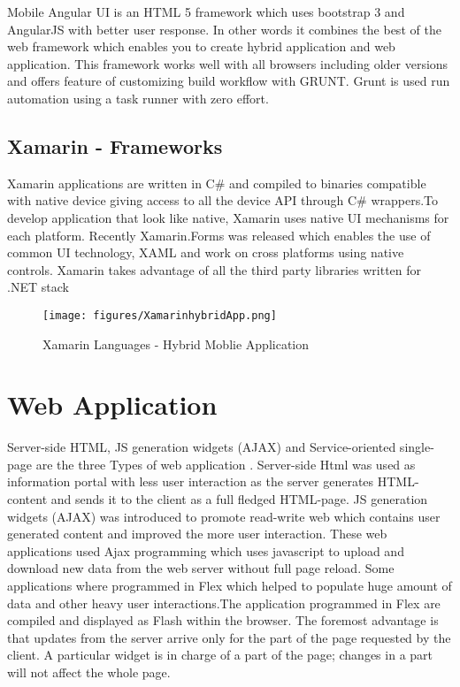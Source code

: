 			Mobile Angular UI is an HTML 5 framework which uses bootstrap 3 and AngularJS with better user response. In other words it combines the best of the web framework which enables you to create hybrid application and web application. This framework works well with all browsers including older versions and offers feature of customizing build workflow with GRUNT. Grunt is used run automation  using a task runner with zero effort.
			
\subsection{Xamarin - Frameworks}

				Xamarin applications are written in C\# and compiled to binaries compatible with native device giving access to all the device API through C\# wrappers.To develop application that look like native, Xamarin uses native UI mechanisms for each platform. Recently Xamarin.Forms was released which enables the use of common UI technology, XAML and work on cross platforms using native controls. Xamarin takes advantage of all the third party libraries written for .NET stack 

\begin{figure}[!htb]
  \texttt{[image: figures/XamarinhybridApp.png]}
	 \caption{ Xamarin Languages - Hybrid Moblie Application }
  \label{fig: Xamarin Languages - Hybrid Moblie Application}
\end{figure}							
			



\section{Web Application}

				Server-side HTML, JS generation widgets (AJAX) and Service-oriented single-page are the three Types of web application . Server-side Html was used as information portal with less user interaction as the server generates HTML-content and sends it to the client as a full fledged HTML-page. JS generation widgets (AJAX) was introduced to promote read-write web which contains user generated content and improved the more user interaction. These web applications used Ajax programming which uses javascript to upload and download new data from the web server without full page reload. Some applications where programmed in Flex which helped to populate huge amount of data and other heavy user interactions.The application programmed in Flex are compiled and displayed as Flash within the browser. The foremost advantage is that updates from the server arrive only for the part of the page requested by the client.  A particular widget is in charge of a part of the page; changes in a part will not affect the whole page. 
				
